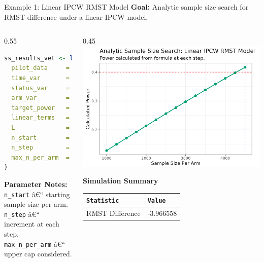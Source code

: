 \documentclass{beamer}
\begin{document}
\begin{frame}[fragile]{Example 1: Linear IPCW RMST Model}
\textbf{Goal:} Analytic sample size search for RMST difference under a linear IPCW model.

\begin{columns}[T,onlytextwidth]
  \begin{column}{0.55\textwidth}
  \scriptsize
\begin{lstlisting}[language=R]
ss_results_vet <- linear.ss.analytical(
  pilot_data     = vet,
  time_var       = "time",
  status_var     = "status",
  arm_var        = "arm",
  target_power   = 0.40,
  linear_terms   = "karno",
  L              = 365,
  n_start        = 1000,
  n_step         = 250,
  max_n_per_arm  = 5000
)
\end{lstlisting}
{\scriptsize
\textbf{Parameter Notes:} \\
\texttt{n\_start} â€“ starting sample size per arm. \\
\texttt{n\_step} â€“ increment at each step. \\
\texttt{max\_n\_per\_arm} â€“ upper cap considered. \\
}
  \end{column}
  \begin{column}{0.45\textwidth}
    \centering
    \includegraphics[width=\linewidth]{images/Example_LIN.png}

    \vspace{0.4em}
    \footnotesize
   \textbf{Simulation Summary}

    \vspace{0.25em}
 \begin{tabular}{@{}ll@{}}
      \toprule
      \texttt{Statistic} & \texttt{Value} \\
      \midrule
       RMST Difference  & -3.966558 \\
      \bottomrule
    \end{tabular}
  \end{column}
\end{columns}


\end{frame}
\end{document}
